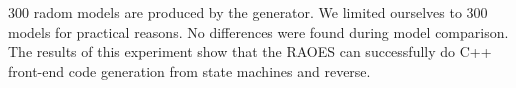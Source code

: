 
300 radom models are produced by the generator. 
We limited ourselves to 300 models for practical reasons. 
No differences were found during model comparison. 
The results of this experiment show that the RAOES can successfully do C++ front-end code generation from state machines and reverse. 

%

%

%


%